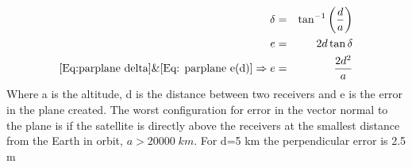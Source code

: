\begin{eqnarray}
\delta &=& \tan^{-1}\left(\frac{d}{a}\right) \label{Eq:parplane delta}\\
e &=& 2d\tan\delta \label{Eq: parplane e(d)}\\
\eqref{Eq:parplane delta} \& \eqref{Eq: parplane e(d)}\Rightarrow e&=&\frac{2d^2}{a}
\end{eqnarray}
Where a is the altitude, d is the distance between two receivers and e is the error in the plane created. The worst configuration for error in the vector normal to the plane is if the satellite is directly above the receivers at the smallest distance from the Earth in orbit, $a>20000\;km$. For d=5 km the perpendicular error is 2.5 m




